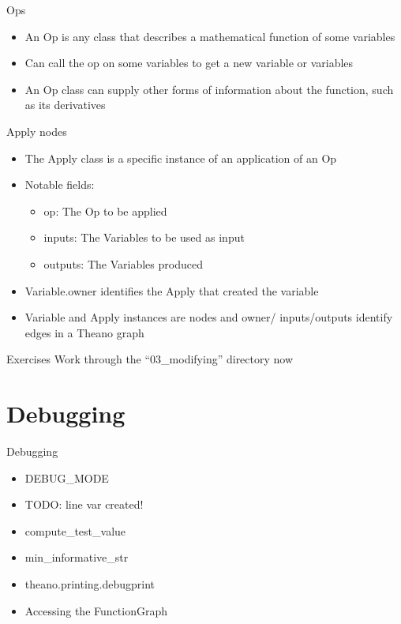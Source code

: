 \documentclass[utf8x,xcolor=pdftex,dvipsnames,table]{beamer}
\begin{document}
\begin{frame}{Ops}
  
  \begin{itemize}
  \item  An Op is any class that describes a
mathematical function of some variables
  \item Can call the op on some variables to get a
new variable or variables
  \item An Op class can supply other forms of
information about the function, such as its
derivatives
  \end{itemize}
\end{frame}

\begin{frame}{Apply nodes}
  \begin{itemize}
  \item The Apply class is a specific instance of an application of an Op
  \item Notable fields:
    \begin{itemize}
    \item op: The Op to be applied
    \item inputs: The Variables to be used as input
    \item outputs: The Variables produced
    \end{itemize}
  \item Variable.owner identifies the Apply that created the variable
  \item Variable and Apply instances are nodes and owner/
    inputs/outputs identify edges in a Theano graph
  \end{itemize}
\end{frame}

\begin{frame}{Exercises}
Work through the ``03\_modifying'' directory now
\end{frame}

\section{Debugging}
\begin{frame}{Debugging}
  \begin{itemize}
  \item DEBUG\_MODE
  \item TODO: line var created!
  \item compute\_test\_value
  \item min\_informative\_str
  \item theano.printing.debugprint
  \item Accessing the FunctionGraph
  \end{itemize}
\end{frame}
\end{document}
